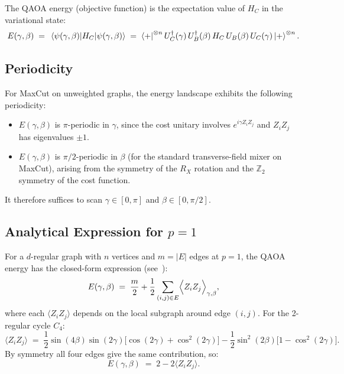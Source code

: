 \documentclass[11pt,a4paper]{article}
\begin{document}
The QAOA energy (objective function) is the expectation value of $H_C$ in the
variational state:
\begin{equation}\label{eq:energy}
  E(\gamma,\beta) \;=\; \expval{H_C}{\psi(\gamma,\beta)}
  \;=\; \bra{+}^{\otimes n} U_C^\dagger(\gamma)\, U_B^\dagger(\beta)\,
        H_C\, U_B(\beta)\, U_C(\gamma) \ket{+}^{\otimes n}.
\end{equation}

\subsection{Periodicity}

For MaxCut on unweighted graphs, the energy landscape exhibits the following
periodicity:
\begin{itemize}
  \item $E(\gamma,\beta)$ is $\pi$-periodic in $\gamma$, since the cost
        unitary involves $e^{i\gamma Z_iZ_j}$ and $Z_iZ_j$ has eigenvalues
        $\pm 1$.
  \item $E(\gamma,\beta)$ is $\pi/2$-periodic in $\beta$ (for the standard
        transverse-field mixer on MaxCut), arising from the symmetry of the
        $R_X$ rotation and the $\mathbb{Z}_2$ symmetry of the cost function.
\end{itemize}
It therefore suffices to scan $\gamma \in [0,\pi]$ and $\beta \in [0,\pi/2]$.

\subsection{Analytical Expression for $p=1$}

For a $d$-regular graph with $n$ vertices and $m=|E|$ edges at $p=1$, the QAOA
energy has the closed-form expression (see~\cite{farhi2014,wang2018}):
\begin{equation}\label{eq:energy-analytic}
  E(\gamma,\beta) \;=\; \frac{m}{2} + \frac{1}{2}\sum_{(i,j)\in E}
    \Bigl\langle Z_i Z_j \Bigr\rangle_{\gamma,\beta},
\end{equation}
where each $\langle Z_iZ_j\rangle$ depends on the local subgraph around edge
$(i,j)$.  For the 2-regular cycle $C_4$:
\begin{equation}
  \langle Z_iZ_j \rangle \;=\; \frac{1}{2}\sin(4\beta)\sin(2\gamma)
  \bigl[\cos(2\gamma) + \cos^2(2\gamma)\bigr]
  - \frac{1}{2}\sin^2(2\beta)\bigl[1 - \cos^2(2\gamma)\bigr].
\end{equation}
By symmetry all four edges give the same contribution, so:
\begin{equation}
  E(\gamma,\beta) \;=\; 2 - 2\langle Z_iZ_j \rangle.
\end{equation}
\end{document}
